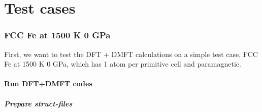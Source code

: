 \documentclass[12 pt]{article}
\begin{document}
  
  \cleardoublepage

  \part{Test cases}

    \section{FCC Fe at 1500 K 0 GPa}

  First, we want to test the DFT + DMFT calculations on a simple test case, FCC Fe at 1500 K 0 GPa, which has 
1 atom per primitive cell and paramagnetic. 

      \subsection{Run DFT+DMFT codes}

	\subsubsection{Prepare struct-files}
\end{document}
